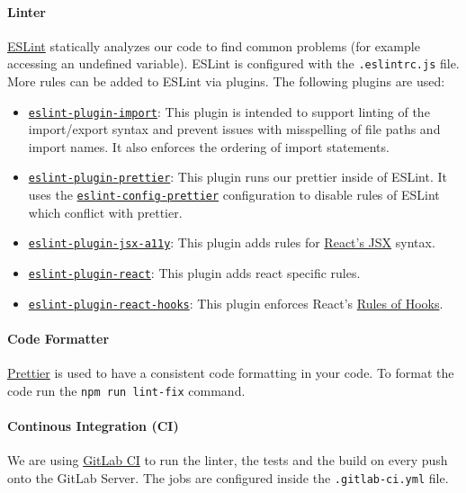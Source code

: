 \paragraph{Linter}
\href{https://eslint.org}{ESLint} statically analyzes our code to find common problems (for example accessing an undefined variable). 
ESLint is configured with the \texttt{.eslintrc.js} file. 
More rules can be added to ESLint via plugins. 
The following plugins are used:
\begin{itemize}
    \item \texttt{\href{https://www.npmjs.com/package/eslint-plugin-import}{eslint-plugin-import}}: 
      This plugin is intended to support linting of the import/export syntax and prevent issues with misspelling of file paths and import names. 
      It also enforces the ordering of import statements.
    \item \texttt{\href{https://www.npmjs.com/package/eslint-plugin-prettier}{eslint-plugin-prettier}}:
      This plugin runs our  prettier inside of ESLint. 
      It uses the \texttt{\href{https://www.npmjs.com/package/eslint-config-prettier}{eslint-config-prettier}} configuration to disable rules of ESLint which conflict with prettier.
    \item \texttt{\href{https://www.npmjs.com/package/eslint-plugin-jsx-a11y}{eslint-plugin-jsx-a11y}}: This plugin adds rules for \href{https://reactjs.org/docs/introducing-jsx.html}{React's JSX} syntax.
    \item \texttt{\href{https://www.npmjs.com/package/eslint-plugin-react}{eslint-plugin-react}}: This plugin adds react specific rules.
    \item \texttt{\href{https://www.npmjs.com/package/eslint-plugin-react-hooks}{eslint-plugin-react-hooks}}: This plugin enforces React's \href{https://reactjs.org/docs/hooks-rules.html}{Rules of Hooks}.
\end{itemize}

\paragraph{Code Formatter}
\label{sec:code-formatter}
\href{https://prettier.io}{Prettier} is used to have a consistent code formatting in your code. 
To format the code run the \texttt{npm run lint-fix} command.

\paragraph{Continous Integration (CI)}
We are using \href{https://mad-srv.informatik.uni-erlangen.de/help/ci/README.md}{GitLab CI} to run the linter, the tests and the build on every push onto the GitLab Server. 
The jobs are configured inside the \texttt{.gitlab-ci.yml} file.

